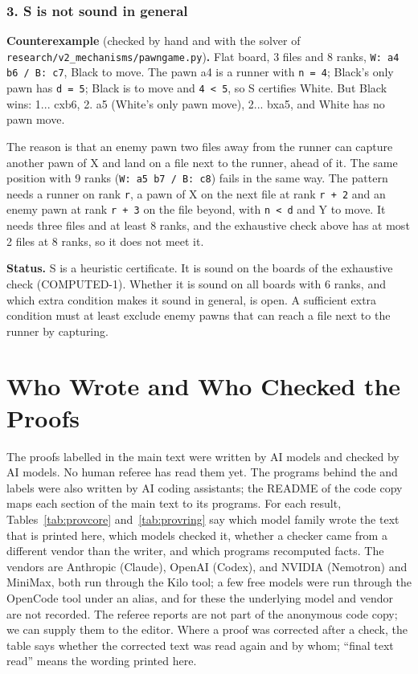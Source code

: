 \subsubsection*{3. S is not sound in general}
\textbf{Counterexample} (checked by hand and with the solver of \texttt{research/v2\_mechanisms/pawngame.py})\textbf{.} Flat board, 3 files and 8 ranks, \texttt{W: a4 b6 / B: c7}, Black to move. The pawn a4 is a runner with \texttt{n = 4}; Black's only pawn has \texttt{d = 5}; Black is to move and \texttt{4 \textless{} 5}, so S certifies White. But Black wins: 1... cxb6, 2. a5 (White's only pawn move), 2... bxa5, and White has no pawn move.

The reason is that an enemy pawn two files away from the runner can capture another pawn of X and land on a file next to the runner, ahead of it. The same position with 9 ranks (\texttt{W: a5 b7 / B: c8}) fails in the same way. The pattern needs a runner on rank \texttt{r}, a pawn of X on the next file at rank \texttt{r + 2} and an enemy pawn at rank \texttt{r + 3} on the file beyond, with \texttt{n \textless{} d} and Y to move. It needs three files and at least 8 ranks, and the exhaustive check above has at most 2 files at 8 ranks, so it does not meet it.

\textbf{Status.} S is a heuristic certificate. It is sound on the boards of the exhaustive check (COMPUTED-1). Whether it is sound on all boards with 6 ranks, and which extra condition makes it sound in general, is open. A sufficient extra condition must at least exclude enemy pawns that can reach a file next to the runner by capturing.


\section{Who Wrote and Who Checked the Proofs}\label{S-prov}
The proofs labelled  in the main text were written by AI models and checked by AI models. No human referee has
read them yet. The programs behind the  and  labels were also written by AI coding assistants; the README of the code copy maps each section of the main text to its programs. For each result, Tables~\ref{tab:provcore} and~\ref{tab:provring} say which model family wrote the text
that is printed here, which models checked it, whether a checker came from a different vendor than the writer, and
which programs recomputed facts. The vendors are Anthropic (Claude), OpenAI (Codex), and NVIDIA (Nemotron) and MiniMax, both run through
the Kilo tool; a few free models were run through the OpenCode tool under an alias, and for these the underlying model and
vendor are not recorded. The referee reports are not part of the anonymous code copy; we can supply them to the editor. Where a proof was corrected after a check, the
table says whether the corrected text was read again and by whom; ``final text read'' means the wording printed here.

